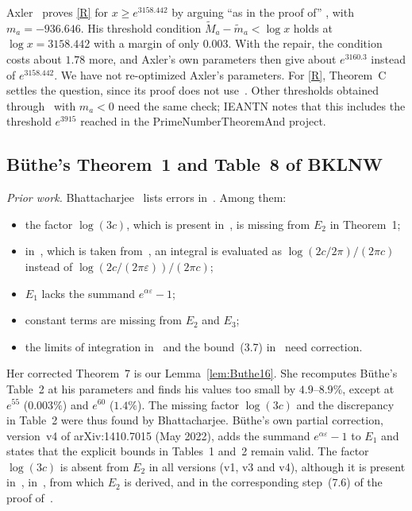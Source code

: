 \documentclass{amsart}
\theoremstyle{definition}
\theoremstyle{remark}
\theoremstyle{plain}
\numberwithin{equation}{section}
\newcommand{\eps}{\varepsilon}
\begin{document}
Axler~\cite{Ax22} proves \eqref{R} for $x\ge e^{3158.442}$ by arguing ``as in the proof of'' \cite[Lemma~2.1]{DP15}, with $m_a=-936.646$. His threshold condition $\widetilde M_a-\widetilde m_a<\log x$ holds at $\log x=3158.442$ with a margin of only $0.003$. With the repair, the condition costs about $1.78$ more, and Axler's own parameters then give about $e^{3160.3}$ instead of $e^{3158.442}$. We have not re-optimized Axler's parameters. For \eqref{R}, Theorem~C settles the question, since its proof does not use~\cite[Lemma~2.1]{DP15}. Other thresholds obtained through~\cite[Lemma~2.1]{DP15} with $m_a<0$ need the same check; IEANTN notes that this includes the threshold $e^{3915}$ reached in the Prime\-Number\-Theorem\-And project.

\subsection{\texorpdfstring{B\"uthe's Theorem~1 and Table~8 of BKLNW}{Buethe's Theorem 1 and Table 8 of BKLNW}}\label{sec:buthe}

\emph{Prior work.} Bhattacharjee~\cite[\S2.3]{Bha24} lists errors in~\cite{But16}. Among them:
\begin{itemize}
\item the factor $\log(3c)$, which is present in~\cite[Prop.~3, (4.1)]{But16}, is missing from $E_2$ in Theorem~1;
\item in~\cite[Lemma~2]{But16}, which is taken from~\cite[Lemma~2.4]{FKBJ17}, an integral is evaluated as $\log(2c/2\pi)/(2\pi c)$ instead of $\log(2c/(2\pi\eps))/(2\pi c)$;
\item $E_1$ lacks the summand $e^{\alpha\eps}-1$;
\item constant terms are missing from $E_2$ and $E_3$;
\item the limits of integration in~\cite[Prop.~1]{But16} and the bound~(3.7) in~\cite[Lemma~1]{But16} need correction.
\end{itemize}
Her corrected Theorem~7 is our Lemma~\ref{lem:Buthe16}. She recomputes B\"uthe's Table~2 at his parameters and finds his values too small by $4.9$--$8.9\%$, except at $e^{55}$ ($0.003\%$) and $e^{60}$ ($1.4\%$). The missing factor $\log(3c)$ and the discrepancy in Table~2 were thus found by Bhattacharjee. B\"uthe's own partial correction, version~v4 of arXiv:1410.7015 (May 2022), adds the summand $e^{\alpha\eps}-1$ to $E_1$ and states that the explicit bounds in Tables~1 and~2 remain valid. The factor $\log(3c)$ is absent from $E_2$ in all versions (v1, v3 and v4), although it is present in~\cite[Lemma~2]{But16}, in~\cite[Prop.~3, (4.1)]{But16}, from which $E_2$ is derived, and in the corresponding step~(7.6) of the proof of~\cite[Thm.~2]{But16}.
\end{document}
